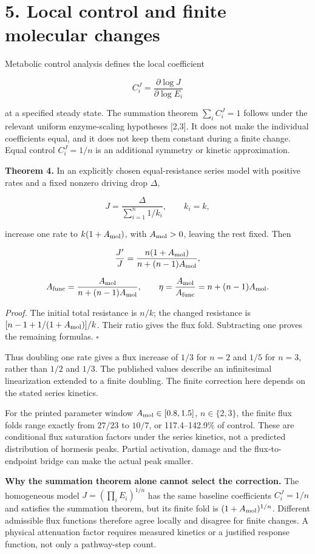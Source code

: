 \documentclass[
  11pt,
  a4paper,
]{article}
\begin{document}
\section{5. Local control and finite molecular changes}\label{local-control-and-finite-molecular-changes}

Metabolic control analysis defines the local coefficient

\[C_i^J=\frac{\partial\log J}{\partial\log E_i}\]

at a specified steady state. The summation theorem \(\sum_i C_i^J=1\) follows under the relevant uniform enzyme-scaling hypotheses {[}2,3{]}. It does not make the individual coefficients equal, and it does not keep them constant during a finite change. Equal control \(C_i^J=1/n\) is an additional symmetry or kinetic approximation.

\textbf{Theorem 4.} In an explicitly chosen equal-resistance series model with positive rates and a fixed nonzero driving drop \(\Delta\),

\[J=\frac{\Delta}{\sum_{i=1}^n 1/k_i},\qquad k_i=k,\]

increase one rate to \(k(1+A_{\rm mol})\), with \(A_{\rm mol}>0\), leaving the rest fixed. Then

\[\frac{J'}J=\frac{n(1+A_{\rm mol})}{n+(n-1)A_{\rm mol}},\]

\[A_{\rm func}=\frac{A_{\rm mol}}{n+(n-1)A_{\rm mol}},
\qquad \eta=\frac{A_{\rm mol}}{A_{\rm func}}
=n+(n-1)A_{\rm mol}.\]

\emph{Proof.} The initial total resistance is \(n/k\); the changed resistance is \([n-1+1/(1+A_{\rm mol})]/k\). Their ratio gives the flux fold. Subtracting one proves the remaining formulas. \(\square\)

Thus doubling one rate gives a flux increase of \(1/3\) for \(n=2\) and \(1/5\) for \(n=3\), rather than \(1/2\) and \(1/3\). The published values describe an infinitesimal linearization extended to a finite doubling. The finite correction here depends on the stated series kinetics.

For the printed parameter window \(A_{\rm mol}\in[0.8,1.5]\), \(n\in\{2,3\}\), the finite flux folds range exactly from \(27/23\) to \(10/7\), or 117.4--142.9\% of control. These are conditional flux saturation factors under the series kinetics, not a predicted distribution of hormesis peaks. Partial activation, damage and the flux-to-endpoint bridge can make the actual peak smaller.

\textbf{Why the summation theorem alone cannot select the correction.} The homogeneous model \(J=(\prod_i E_i)^{1/n}\) has the same baseline coefficients \(C_i^J=1/n\) and satisfies the summation theorem, but its finite fold is \((1+A_{\rm mol})^{1/n}\). Different admissible flux functions therefore agree locally and disagree for finite changes. A physical attenuation factor requires measured kinetics or a justified response function, not only a pathway-step count.
\end{document}
